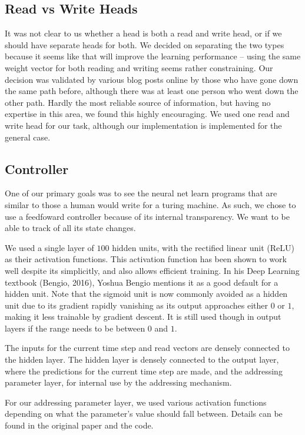 \documentclass[12pt]{article}
\begin{document}
\subsection{Read vs Write Heads}

It was not clear to us whether a head is both a read and write head, or if we
should have separate heads for both. We decided on separating the two types
because it seems like that will improve the learning performance -- using the
same weight vector for both reading and writing seems rather constraining.
Our decision was validated by various blog posts online by those who have gone
down the same path before, although there was at least one person who went down
the other path. Hardly the most reliable source of information, but having
no expertise in this area, we found this highly encouraging. We used one read
and write head for our task, although our implementation is implemented for the
general case.

\subsection{Controller}

One of our primary goals was to see the neural net learn programs that are
similar to those a human would write for a turing machine. As such, we chose
to use a feedfoward controller because of its internal transparency. We want
to be able to track of all its state changes.

We used a single layer of $100$ hidden units, with the rectified linear unit (ReLU)
as their activation functions. This activation function has been shown to work
well despite its simplicitly, and also allows efficient training.
In his Deep Learning textbook (Bengio, 2016)\cite{Goodfellow-et-al-2016-Book}, Yoshua Bengio
mentions it as a good default for a hidden unit. Note that the sigmoid unit is now
commonly avoided as a hidden unit due to its gradient rapidly vanishing
as its output approaches either $0$ or $1$, making it less trainable by gradient
descent. It is still used though in output layers if the range needs to be between
$0$ and $1$.

The inputs for the current time step and read vectors are densely connected to the
hidden layer. The hidden layer is densely connected to the output layer, where the
predictions for the current time step are made, and the addressing parameter layer,
for internal use by the addressing mechanism.

For our addressing parameter layer, we used various activation functions depending
on what the parameter's value should fall between. Details can be found in
the original paper and the code.
\end{document}
